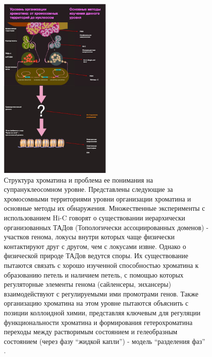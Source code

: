 \begin{figure} [H]
    \centering
    \includegraphics[width=0.5\textwidth]{images/p6/p6_1_vved/p6_1_f2.2.pdf}
    \caption[Структура хроматина и проблема ее понимания на супрануклеосомном уровне.]{Структура хроматина и проблема ее понимания на супрануклеосомном уровне. Представлены следующие за хромосомными территориями уровни организации хроматина и основные методы их обнаружения. Множественные эксперименты с использованием Hi-C говорят о существовании иерархически организованных ТАДов (Топологически ассоциированных доменов) - участков генома, локусы внутри которых чаще физически контактируют друг с другом, чем с локусами извне. Однако о физической природе ТАДов ведутся споры. Их существование пытаются связать с хорошо изученной способностью хроматина к образованию петель и наличием петель, с помощью которых регуляторные элементы генома (сайленсеры, энхансеры) взаимодействуют с регулируемыми ими промотрами генов. Также организацию хроматина на этом уровне пытаются объяснить с позиции коллоидной химии, представляя ключевым для регуляции функциональности хроматина и формирования гетерохроматина переходы между растворимым состоянием и гелеобразным состоянием (через фазу ``жидкой капли'') - модель ``разделения фаз'' \cite{larson_role_2018}.}
    \label{fig:p6_1_f2.2}
\end{figure}
    
